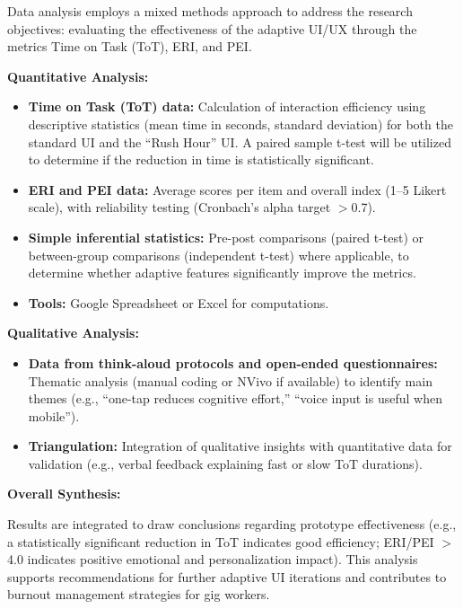 Data analysis employs a mixed methods approach to address the research objectives: evaluating the effectiveness of the adaptive UI/UX through the metrics Time on Task (ToT), ERI, and PEI.

\textbf{Quantitative Analysis:}
\begin{itemize}
    \item \textbf{Time on Task (ToT) data:} Calculation of interaction efficiency using descriptive statistics (mean time in seconds, standard deviation) for both the standard UI and the ``Rush Hour'' UI. A paired sample t-test will be utilized to determine if the reduction in time is statistically significant.
    \item \textbf{ERI and PEI data:} Average scores per item and overall index (1--5 Likert scale), with reliability testing (Cronbach's alpha target $>$0.7).
    \item \textbf{Simple inferential statistics:} Pre-post comparisons (paired t-test) or between-group comparisons (independent t-test) where applicable, to determine whether adaptive features significantly improve the metrics.
    \item \textbf{Tools:} Google Spreadsheet or Excel for computations.
\end{itemize}

\textbf{Qualitative Analysis:}
\begin{itemize}
    \item \textbf{Data from think-aloud protocols and open-ended questionnaires:} Thematic analysis (manual coding or NVivo if available) to identify main themes (e.g., ``one-tap reduces cognitive effort,'' ``voice input is useful when mobile'').
    \item \textbf{Triangulation:} Integration of qualitative insights with quantitative data for validation (e.g., verbal feedback explaining fast or slow ToT durations).
\end{itemize}

\textbf{Overall Synthesis:}

Results are integrated to draw conclusions regarding prototype effectiveness (e.g., a statistically significant reduction in ToT indicates good efficiency; ERI/PEI $>$4.0 indicates positive emotional and personalization impact). This analysis supports recommendations for further adaptive UI iterations and contributes to burnout management strategies for gig workers.

